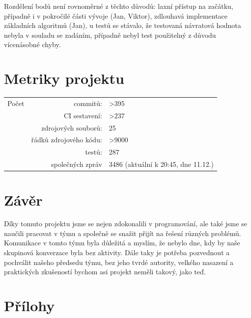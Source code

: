 \documentclass[a4paper,11pt]{article}
\begin{document}
Rozdělení bodů není rovnoměrné z těchto důvodů: laxní přístup na začátku, případně i v pokročilé části vývoje (Jan, Viktor), zdlouhavá implementace základních algoritmů (Jan), u testů se stávalo, že testovaná návratová hodnota nebyla v souladu se zadáním, případně nebyl test použitelný z důvodu vícenásobné chyby.

\section{Metriky projektu}
\begin{tabular}{l r l}
	Počet 	& commitů: 					& \textgreater 395 	\\
			& CI sestavení: 			& \textgreater 237 	\\
			& zdrojových souborů: 		& 25				\\
			& řádků zdrojového kódu: 	& >9000 			\\
			& testů: 					& 287				\\
			& společných zpráv			& 3486 (aktuální k 20:45, dne 11.12.)
\end{tabular}
\section{Závěr}
Díky tomuto projektu jsme se nejen zdokonalili v programování, ale také jsme se naučili pracovat v týmu a společně se snažit přijít na řešení různých problémů. Komunikace v tomto týmu byla důležitá a myslím, že nebylo dne, kdy by naše skupinová konverzace byla bez aktivity. Dále taky je potřeba pozvednout a pochválit našeho předsedu týmu, bez jeho tvrdé autority, velkého nasazení a praktických zkušeností bychom asi projekt neměli takový, jako teď.
\newpage
\section{Přílohy}
\end{document}
